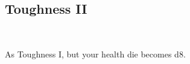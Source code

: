 \subsection*{Toughness II}\label{feat:toughness2}
 \\

As Toughness I, but your health die becomes d8.

